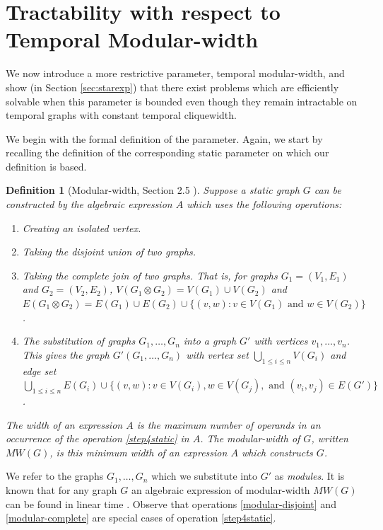 \documentclass[preprint,12pt]{elsarticle}
\newtheorem{definition}{Definition}
\begin{document}
\section{Tractability with respect to Temporal Modular-width}\label{sec:TMW}

We now introduce a more restrictive parameter, temporal modular-width, and show (in Section \ref{sec:starexp}) that there exist problems which are efficiently solvable when this parameter is bounded even though they remain intractable on temporal graphs with constant temporal cliquewidth.

We begin with the formal definition of the parameter.  Again, we start by recalling the definition of the corresponding static parameter on which our definition is based. 
\begin{definition}[Modular-width, Section 2.5 \cite{gajarsky_parameterized_2013}]\label{def:mw}
    Suppose a static graph $G$ can be constructed by the algebraic expression $A$ which uses the following operations:
    \begin{enumerate}
        \item Creating an isolated vertex.
        \item\label{modular-disjoint} Taking the disjoint union of two graphs.
        \item\label{modular-complete} Taking the complete join of two graphs. That is, for graphs $G_1=(V_1,E_1)$ and $G_2=(V_2,E_2)$, $V(G_1\otimes G_2)=V(G_1)\cup V(G_2)$ and $E(G_1\otimes G_2)=E(G_1)\cup E(G_2)\cup \{(v,w):v\in V(G_1) \text{ and }w\in V(G_2)\}$.
        \item\label{step4static} The substitution of graphs $G_1,\ldots, G_n$ into a graph $G'$ with vertices $v_1,\ldots,v_n$. This gives the graph $G'(G_1,\ldots,G_n)$ with vertex set $\bigcup_{1\leq i\leq n}V(G_i)$ and edge set $\bigcup_{1\leq i\leq n}E(G_i)\cup \{(v,w):v\in V(G_i), w\in V(G_j),\text{ and }(v_i,v_j)\in E(G')\}$.
    \end{enumerate}
    The width of an expression $A$ is the maximum number of operands in an occurrence of the operation \ref{step4static} in $A$. The \emph{modular-width} of $G$, written $MW(G)$, is this minimum width of an expression $A$ which constructs $G$.
\end{definition}
We refer to the graphs $G_1,\ldots, G_n$ which we substitute into $G'$ as \emph{modules}.  It is known that for any graph $G$ an algebraic expression of modular-width $MW(G)$ can be found in linear time \cite{mcconnell_modular_1999,tedder_simpler_2008}. Observe that operations \ref{modular-disjoint} and \ref{modular-complete} are special cases of operation \ref{step4static}.
\end{document}
